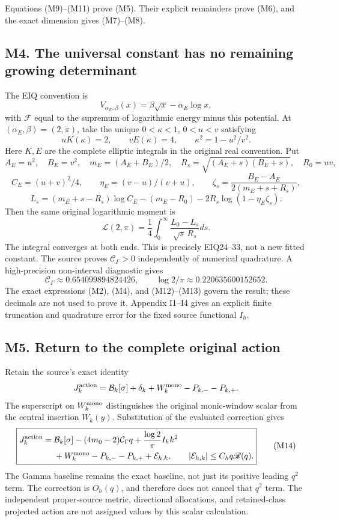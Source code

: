 Equations (M9)--(M11) prove (M5). Their explicit remainders prove (M6),
and the exact dimension gives (M7)--(M8).

\subsection{M4. The universal constant has no remaining growing
determinant}\label{sa:m4.-the-universal-constant-has-no-remaining-growing-determinant}

The EIQ convention is \[
V_{\alpha_E,\beta}(x)=\beta\sqrt x-\alpha_E\log x,
\] with \(\mathcal F\) equal to the supremum of logarithmic energy minus
this potential. At \((\alpha_E,\beta)=(2,\pi)\), take the unique
\(0<\kappa<1\), \(0<u<v\) satisfying \[
uK(\kappa)=2,\qquad vE(\kappa)=4,\qquad
\kappa^2=1-u^2/v^2.
\tag{M12}
\] Here \(K,E\) are the complete elliptic integrals in the original real
convention. Put \[
A_E=u^2,\quad B_E=v^2,\quad m_E=(A_E+B_E)/2,\quad
R_s=\sqrt{(A_E+s)(B_E+s)},\quad R_0=uv,
\] \[
C_E=(u+v)^2/4,\qquad \eta_E=(v-u)/(v+u),\qquad
\zeta_s=\frac{B_E-A_E}{2(m_E+s+R_s)},
\] \[
L_s=(m_E+s-R_s)\log C_E-(m_E-R_0)
-2R_s\log(1-\eta_E\zeta_s).
\] Then the same original logarithmic moment is \[
\boxed{\mathcal L(2,\pi)=
\frac14\int_0^\infty\frac{L_0-L_s}{\sqrt s\,R_s}ds.}\tag{M13}
\] The integral converges at both ends. This is precisely EIQ24--33, not
a new fitted constant. The source proves \(\mathcal C_\Gamma>0\)
independently of numerical quadrature. A high-precision non-interval
diagnostic gives \[
\mathcal C_\Gamma\approx0.654099894824426,\qquad
\log2/\pi\approx0.220635600152652.
\] The exact expressions (M2), (M4), and (M12)--(M13) govern the result;
these decimals are not used to prove it. Appendix I1--I4 gives an
explicit finite truncation and quadrature error for the fixed source
functional \(I_h\).

\subsection{M5. Return to the complete original
action}\label{sa:m5.-return-to-the-complete-original-action}

Retain the source's exact identity \[
J_k^{\rm action}=\mathcal B_k[\sigma]+\delta_k
+W_k^{\rm mono}-P_{k,-}-P_{k,+}.
\] The superscript on \(W_k^{\rm mono}\) distinguishes the original
monic-window scalar from the central insertion \(W_k(y)\). Substitution
of the evaluated correction gives \[
\boxed{\begin{aligned}
J_k^{\rm action}={}&\mathcal B_k[\sigma]
-(4m_0-2)\mathcal C_\Gamma q
+\frac{\log2}{\pi}I_hk^2\\
&+W_k^{\rm mono}-P_{k,-}-P_{k,+}
+\mathcal E_{h,k},
\qquad |\mathcal E_{h,k}|\le C_hq\mathscr R(q).
\end{aligned}}\tag{M14}
\] The Gamma baseline remains the exact baseline, not just its positive
leading \(q^2\) term. The correction is \(O_h(q)\), and therefore does
not cancel that \(q^2\) term. The independent proper-source metric,
directional allocations, and retained-class projected action are not
assigned values by this scalar calculation.


